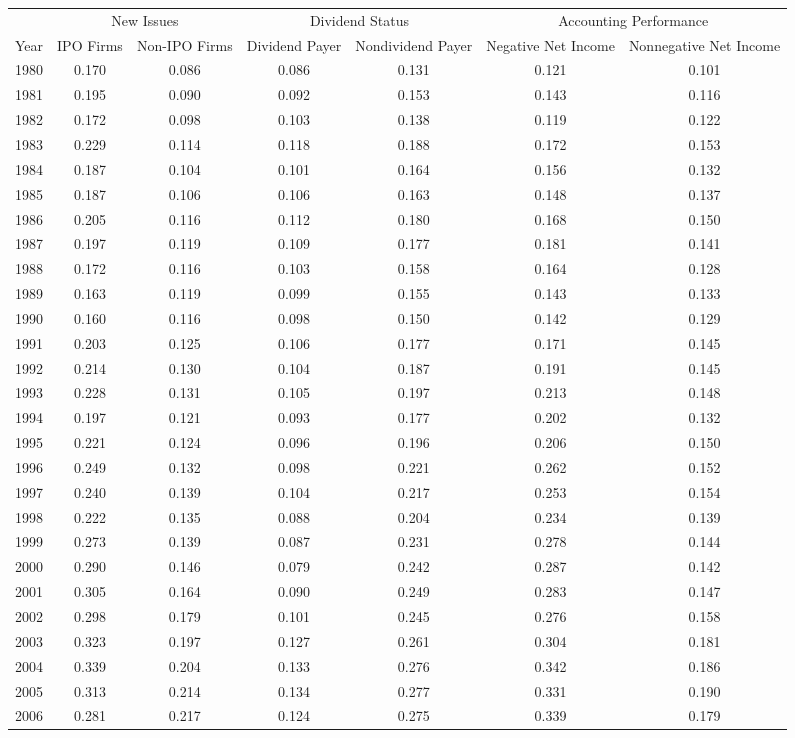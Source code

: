 \begin{tabular}{l c c c c c c}
\toprule
& \multicolumn{2}{c}{New Issues} & \multicolumn{2}{c}{Dividend Status} & \multicolumn{2}{c}{Accounting Performance} \\
\cmidrule(lr){2-3} \cmidrule(lr){4-5} \cmidrule(lr){6-7}
Year & \multicolumn{1}{p{2cm}}{\centering IPO Firms} & \multicolumn{1}{p{2cm}}{\centering Non-IPO Firms} & \multicolumn{1}{p{2cm}}{\centering Dividend Payer} & \multicolumn{1}{p{2cm}}{\centering Nondividend Payer} & \multicolumn{1}{p{2cm}}{\centering Negative Net Income} & \multicolumn{1}{p{2cm}}{\centering Nonnegative Net Income}\\
\midrule
1980&0.170&0.086&0.086&0.131&0.121&0.101\\
1981&0.195&0.090&0.092&0.153&0.143&0.116\\
1982&0.172&0.098&0.103&0.138&0.119&0.122\\
1983&0.229&0.114&0.118&0.188&0.172&0.153\\
1984&0.187&0.104&0.101&0.164&0.156&0.132\\
1985&0.187&0.106&0.106&0.163&0.148&0.137\\
1986&0.205&0.116&0.112&0.180&0.168&0.150\\
1987&0.197&0.119&0.109&0.177&0.181&0.141\\
1988&0.172&0.116&0.103&0.158&0.164&0.128\\
1989&0.163&0.119&0.099&0.155&0.143&0.133\\
1990&0.160&0.116&0.098&0.150&0.142&0.129\\
1991&0.203&0.125&0.106&0.177&0.171&0.145\\
1992&0.214&0.130&0.104&0.187&0.191&0.145\\
1993&0.228&0.131&0.105&0.197&0.213&0.148\\
1994&0.197&0.121&0.093&0.177&0.202&0.132\\
1995&0.221&0.124&0.096&0.196&0.206&0.150\\
1996&0.249&0.132&0.098&0.221&0.262&0.152\\
1997&0.240&0.139&0.104&0.217&0.253&0.154\\
1998&0.222&0.135&0.088&0.204&0.234&0.139\\
1999&0.273&0.139&0.087&0.231&0.278&0.144\\
2000&0.290&0.146&0.079&0.242&0.287&0.142\\
2001&0.305&0.164&0.090&0.249&0.283&0.147\\
2002&0.298&0.179&0.101&0.245&0.276&0.158\\
2003&0.323&0.197&0.127&0.261&0.304&0.181\\
2004&0.339&0.204&0.133&0.276&0.342&0.186\\
2005&0.313&0.214&0.134&0.277&0.331&0.190\\
2006&0.281&0.217&0.124&0.275&0.339&0.179\\
\bottomrule
\end{tabular}
